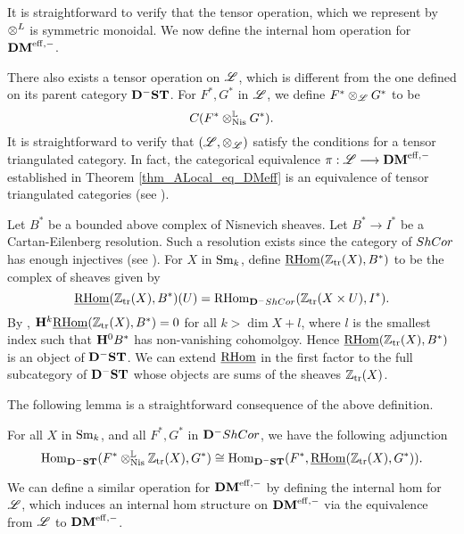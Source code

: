 It is straightforward to verify that the tensor operation, which
we represent by $\tDM$ is symmetric monoidal. We now define the 
internal hom operation for $\DMeff$.

There also exists a tensor operation on $\ALocal$, which is different
from the one defined on its parent category $\DShCor$.  For $F^*, G^*$
in $\ALocal$, we define $F^* \tAL G^*$ to be
\[
\suslC[]( F^* \tLNis G^* ).
\]
It is straightforward to verify that $(\ALocal, \tAL)$ satisfy
the conditions for a tensor triangulated category. In fact, the
categorical equivalence $\pi : \ALocal \to \DMeff$ established
in Theorem \ref{thm_ALocal_eq_DMeff} is an equivalence of tensor
triangulated categories (see \cite[14.11]{MVW}).

\begin{defn}
Let $B^*$ be a bounded above complex of Nisnevich sheaves. Let $B^*
\to I^*$ be a Cartan-Eilenberg resolution. Such a resolution 
exists since the category of $\ShCor$ has enough injectives (see 
\cite[6.19]{MVW}). For $X$ in $\Sm$, define 
$\sheaf{\rhom}(\Ztr(X), B^*)$ to be the complex of sheaves given by
\[
\sheaf{\rhom}(\Ztr(X), B^*)(U) = \rhom_{\DCat^-\ShCor}(\Ztr(X \times U),
I^*).
\]
By \cite[3.2.9]{TriCa}, $\HH^k \sheaf{\rhom}(\Ztr(X), B^*) = 0$ for
all $k > \dim X + l$, where $l$ is the smallest index such that
$\HH^0B^*$ has non-vanishing cohomolgoy. Hence $\sheaf{\rhom}(\Ztr(X),
B^*)$ is an object of $\DShCor$. We can extend $\sheaf{\rhom}$ in the
first factor to the full subcategory of $\DShCor$ whose objects are
sums of the sheaves $\Ztr(X)$.
\end{defn}

The following lemma is a straightforward consequence of the above 
definition.

\begin{lem}\label{lem_ihom_tL_adjunction}
For all $X$ in $\Sm$, and all $F^*, G^*$ in $\DCat^-\ShCor$, we 
have the following adjunction
\[
\hom_{\DShCor}(F^*\tLNis \Ztr(X), G^*) \cong
\hom_{\DShCor}(F^*, \sheaf{\rhom}(\Ztr(X), G^*)).
\]
\end{lem}

We can define a similar operation for $\DMeff$ by
defining the internal hom for $\ALocal$, which induces an internal
hom structure on $\DMeff$ via the equivalence from $\ALocal$ to
$\DMeff$.

